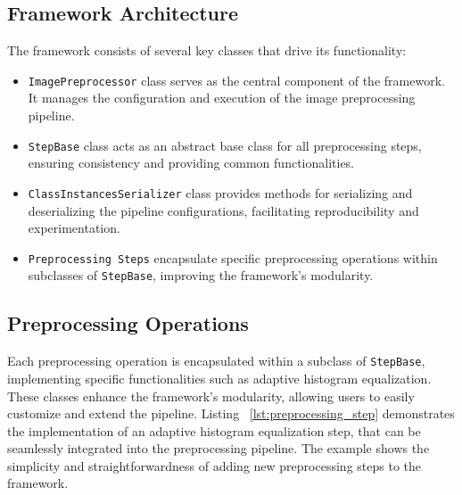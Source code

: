 \documentclass[journal]{new-aiaa}
\begin{document}
\subsection{Framework Architecture}
\label{sec:framework_architecture}
The framework consists of several key classes that drive its functionality:
\begin{itemize}
	\item \texttt{ImagePreprocessor} class serves as the central component of the framework. It manages the configuration and execution of the image preprocessing pipeline.
	\item \texttt{StepBase} class acts as an abstract base class for all preprocessing steps, ensuring consistency and providing common functionalities.
	\item \texttt{ClassInstancesSerializer} class provides methods for serializing and deserializing the pipeline configurations, facilitating reproducibility and experimentation.
	\item \texttt{Preprocessing Steps} encapsulate specific preprocessing operations within subclasses of \texttt{StepBase}, improving the framework's modularity.
\end{itemize}




\subsection{Preprocessing Operations}
Each preprocessing operation is encapsulated within a subclass of \texttt{StepBase}, implementing specific functionalities such as adaptive histogram equalization. These classes enhance the framework's modularity, allowing users to easily customize and extend the pipeline. Listing ~\ref{lst:preprocessing_step} demonstrates the implementation of an adaptive histogram equalization step, that can be seamlessly integrated into the preprocessing pipeline. The example shows the simplicity and straightforwardness of adding new preprocessing steps to the framework.\\
\end{document}
